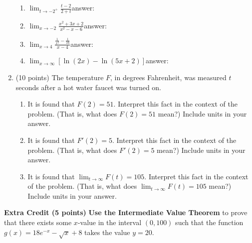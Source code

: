 \documentclass[11pt]{article}
\renewcommand{\d}{\displaystyle}
\begin{document}
\begin{enumerate}
\begin{enumerate}
	\item $\d \lim_{t\to-2^+} \frac{t - 2}{2 + t}$\hfill answer: \ans\ans%
	\vfill
	\item $\d \lim_{x\to -2}\frac{x^2+3x+2}{x^2-x-6}$\hfill answer: \ans\ans %
	\vfill
	\item $\d \lim_{x\to4}\frac{\frac{1}{x^2} - \frac{1}{16}}{x - 4}$\hfill answer: \ans\ans %
	\vfill
	\item $\d \lim_{x\to\infty}\left[\ln{(2x)} - \ln(5x + 2)\right]$\hfill answer: \ans\ans %
	\vfill
\end{enumerate}

\newpage
\item (10 points) The temperature $F$, in degrees Fahrenheit, was measured $t$ seconds after a hot water faucet was turned on.
	\begin{enumerate}
	\item It is found that $F(2)=51.$ Interpret this fact in the context of the problem. (That is, what does $F(2)=51$ mean?)  Include units in your answer.
	\vspace{1in}	
	\item It is found that $F'(2)=5.$ Interpret this fact in the context of the problem. (That is, what does $F'(2)=5$ mean?) Include units in your answer.
	\vspace{1in}
	\item It is found that $\displaystyle{\lim_{t \to \infty} F(t)=105}.$ Interpret this fact in the context of the problem. (That is, what does $\displaystyle{\lim_{t \to \infty} F(t)=105}$ mean?)  Include units in your answer.
	\vspace{1in}
	\end{enumerate}


\end{enumerate}


\textbf{Extra Credit (5 points)} \textbf{Use the Intermediate Value Theorem} to prove that there exists some $x$-value in the interval $(0,100)$ such that the function $g(x)=18e^{-x}-\sqrt{x}+8$ takes the value $y=20.$
\vfill
\end{document}

